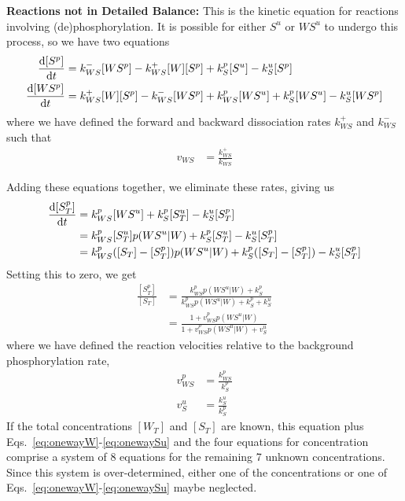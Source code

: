 \documentclass[aps,onecolumn,superscriptaddress,notitlepage]{revtex4-1}
\begin{document}
\textbf{Reactions not in  Detailed Balance:}
This is the kinetic equation for reactions involving (de)phosphorylation. 
It is possible for either $S^u$ or $WS^u$ to undergo this process, so we have two equations
\begin{align}
\dv{[S^p]}{t} &=  k_{WS}^-[WS^p] - k_{WS}^+[W][S^p] + k_S^p[S^u] - k_S^u[S^p]\\
\dv{[WS^p]}{t} &= k_{WS}^+[W][S^p] -k_{WS}^-[WS^p] + k_{WS}^p[WS^u] + k_S^p[WS^u] - k_S^u[WS^p]
\end{align}
where we have defined the forward and backward dissociation rates $k_{WS}^+$ and $k_{WS}^-$ such that
\begin{align}
v_{WS} &= \frac{k_{WS}^+}{k_{WS}^-}
\end{align}
%

Adding these equations together, we eliminate these rates, giving us
\begin{align}
\dv{[S^p_T]}{t} &= k_{WS}^p[WS^u] + k_S^p[S_T^u] - k_S^u[S_T^p]\\
&= k_{WS}^p[S_T^u]p(WS^u|W) + k_S^p[S_T^u] - k_S^u[S_T^p]\\
&= k_{WS}^p([S_T]-[S_T^p])p(WS^u|W) + k_S^p([S_T]-[S_T^p]) - k_S^u[S_T^p]
\end{align}
Setting this to zero, we get
\begin{align}
\frac{[S_T^p]}{[S_T]} &= \frac{k_{WS}^p p(WS^u|W) + k_S^p}{k_{WS}^p p(WS^u|W) + k_S^p+k_S^u}\\
 &= \frac{1 + v_{WS}^p p(WS^u|W)}{1 + v_{WS}^p p(WS^u|W) + v_S^u}
\end{align}
where we have defined the reaction velocities relative to the background phosphorylation rate,
\begin{align}
v_{WS}^p &= \frac{k_{WS}^p}{k_S^p}\\
v_S^u &= \frac{k_S^u}{k_S^p}
\end{align}
If the total concentrations $[W_T]$ and $[S_T]$ are known, this equation plus Eqs.~\eqref{eq:onewayW}-\eqref{eq:onewaySu} and the four equations for concentration comprise a system of 8 equations for the remaining 7 unknown concentrations. Since this system is over-determined, either one of the concentrations or one of Eqs.~\eqref{eq:onewayW}-\eqref{eq:onewaySu} maybe neglected.
\end{document}
